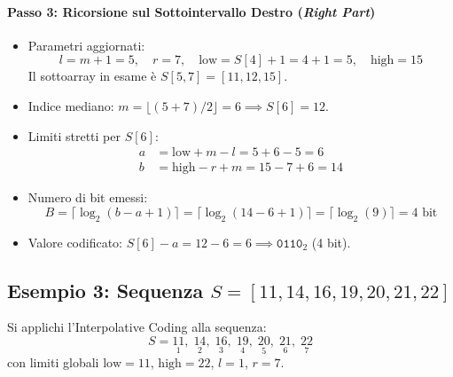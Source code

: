 \paragraph{Passo 3: Ricorsione sul Sottointervallo Destro (\textit{Right Part})}
\begin{itemize}
  \item Parametri aggiornati:
  \begin{equation*}
    l = m + 1 = 5, \quad r = 7, \quad \text{low} = S[4] + 1 = 4 + 1 = 5, \quad \text{high} = 15
  \end{equation*}
  Il sottoarray in esame \`e $S[5, 7] = [11, 12, 15]$.
  \item Indice mediano: $m = \lfloor (5 + 7)/2 \rfloor = 6 \implies S[6] = 12$.
  \item Limiti stretti per $S[6]$:
  \begin{align*}
    a &= \text{low} + m - l = 5 + 6 - 5 = 6 \\
    b &= \text{high} - r + m = 15 - 7 + 6 = 14
  \end{align*}
  \item Numero di bit emessi:
  \begin{equation*}
    B = \lceil \log_2(b - a + 1) \rceil = \lceil \log_2(14 - 6 + 1) \rceil = \lceil \log_2(9) \rceil = 4 \text{ bit}
  \end{equation*}
  \item Valore codificato: $S[6] - a = 12 - 6 = 6 \implies \texttt{0110}_2$ (4 bit).
\end{itemize}

\FloatBarrier
\subsection{Esempio 3: Sequenza $S = [11, 14, 16, 19, 20, 21, 22]$}
\label{subsec:es3-interpolative-completo}

\begin{example}
Si applichi l'Interpolative Coding alla sequenza:
\begin{equation*}
  S = \underset{1}{11}, \; \underset{2}{14}, \; \underset{3}{16}, \; \underset{4}{19}, \; \underset{5}{20}, \; \underset{6}{21}, \; \underset{7}{22}
\end{equation*}
con limiti globali $\text{low} = 11$, $\text{high} = 22$, $l = 1$, $r = 7$.
\end{example}

